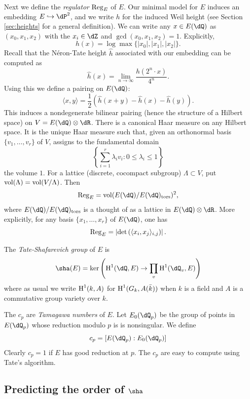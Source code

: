 Next we define the \emph{regulator} $\operatorname{Reg}_E$ of $E$. Our minimal model 
for $E$ induces an embedding $E\hookrightarrow \dP^2$, and we write $h$ for 
the induced Weil height (see Section \ref{sec:heights} for a general 
definition). We can write any $x\in E(\dQ)$ as $(x_0,x_1,x_2)$ with the 
$x_i\in \dZ$ and $\gcd(x_0,x_1,x_2)=1$. Explicitly, 
\[
  h(x) = \log \max\{|x_0|,|x_1|,|x_2|\} \text{.}
\]
Recall that the N\'eron-Tate height $\widehat h$ associated with our embedding 
can be computed as 
\[
  \widehat h(x) = \lim_{n\to \infty} \frac{h(2^n\cdot x)}{4^n} \text{.}
\]
Using this we define a pairing on $E(\dQ)$:
\[
  \langle x,y\rangle = \frac 1 2\left(\widehat h(x+y)-\widehat h(x)-\widehat h(y)\right) \text{.}
\]
This induces a nondegenerate bilinear pairing (hence the structure of a 
Hilbert space) on $V=E(\dQ)\otimes \dR$. There is a canonical Haar measure 
on any Hilbert space. It is the unique Haar measure such that, given an 
orthonormal basis $\{v_1,\dots,v_r\}$ of $V$, assigns to the fundamental 
domain 
\[
  \left\{\sum_{i=1}^r  \lambda_i v_i : 0\leqslant \lambda_i \leqslant 1\right\}
\]
the volume $1$. For a lattice (discrete, cocompact subgroup) 
$\Lambda\subset V$, put $\operatorname{vol}(\Lambda)=\operatorname{vol}(V/\Lambda)$. Then 
\[
  \regulator_E = \volume(E(\dQ)/E(\dQ)_\text{tors})^2 \text{,}
\]
where $E(\dQ)/E(\dQ)_\text{tors}$ is a thought of as a lattice in 
$E(\dQ)\otimes \dR$. More explicitly, for any basis 
$\{x_1,\dots,x_r\}$ of $E(\dQ)$, one has 
\[
  \operatorname{Reg}_E = \left|\det\left(\langle x_i,x_j\rangle_{i,j}\right) \right| \text{.}
\]

The \emph{Tate-Shafarevich group} of $E$ is 
\[
  \sha(E) = \ker\left(\h^1(\dQ,E) \to \prod_v \h^1(\dQ_v,E)\right)
\]
where as usual we write $\operatorname{H}^1(k,A)$ for $\operatorname{H}^1(G_k,A(\bar k))$ when $k$ is a 
field and $A$ is a commutative group variety over $k$. 

The $c_p$ are \emph{Tamagawa numbers} of $E$. Let $E_0(\dQ_p)$ be the group of 
points in $E(\dQ_p)$ whose reduction modulo $p$ is is nonsingular. We define 
\[
  c_p=[E(\dQ_p):E_0(\dQ_p)]
\]
Clearly $c_p=1$ if $E$ has good reduction at $p$. The $c_p$ are easy to compute 
using Tate's algorithm. 










\subsection{Predicting the order of \texorpdfstring{$\sha$}{Sha}}


